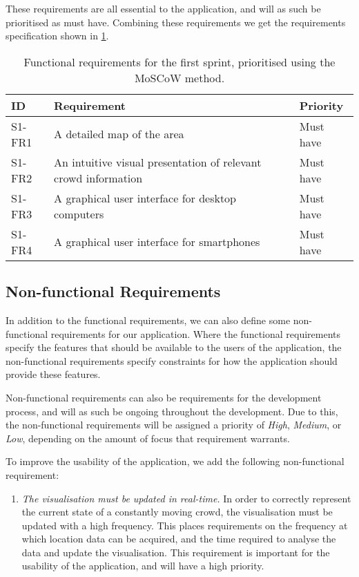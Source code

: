 These requirements are all essential to the application, and will as such be prioritised as must have. Combining these requirements we get the requirements specification shown in \cref{tab:s1_req}.

\begin{table}[htbp]
	\centering
	\begin{tabularx}{\textwidth}{lXl}
		\toprule
		\textbf{ID} & \textbf{Requirement} & \textbf{Priority} \\
		\midrule 
		\rowcolor[HTML]{EFEFEF} 
		S1-FR1 & A detailed map of the area & Must have \\
		S1-FR2 & An intuitive visual presentation of relevant crowd information & Must have \\
		\rowcolor[HTML]{EFEFEF} 
		S1-FR3 & A graphical user interface for desktop computers & Must have \\
		S1-FR4 & A graphical user interface for smartphones & Must have \\
		\bottomrule
	\end{tabularx}
	\caption{Functional requirements for the first sprint, prioritised using the MoSCoW method.}
	\label{tab:s1_req}
\end{table}

\subsection{Non-functional Requirements} \label{ss:s1_nfreqs}
In addition to the functional requirements, we can also define some non-functional requirements for our application. Where the functional requirements specify the features that should be available to the users of the application, the non-functional requirements specify constraints for how the application should provide these features. 

Non-functional requirements can also be requirements for the development process, and will as such be ongoing throughout the development. Due to this, the non-functional requirements will be assigned a priority of \emph{High}, \emph{Medium}, or \emph{Low}, depending on the amount of focus that requirement warrants. 

To improve the usability of the application, we add the following non-functional requirement:

\begin{enumerate}
    \item \emph{The visualisation must be updated in real-time.} In order to correctly represent the current state of a constantly moving crowd, the visualisation must be updated with a high frequency. This places requirements on the frequency at which location data can be acquired, and the time required to analyse the data and update the visualisation. This requirement is important for the usability of the application, and will have a high priority.
\end{enumerate}

